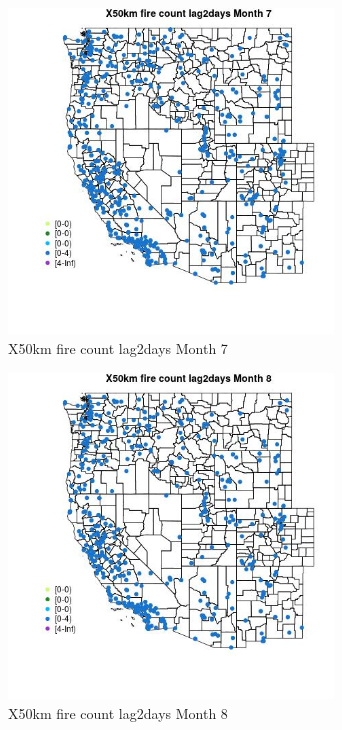 \begin{figure} 
\centering  
\includegraphics[width=0.77\textwidth]{Code_Outputs/Report_ML_input_PM25_Step4_part_e_de_duplicated_aves_compiled_2019-05-14wNAs_MapObsMo7X50km_fire_count_lag2days.jpg} 
\caption{\label{fig:Report_ML_input_PM25_Step4_part_e_de_duplicated_aves_compiled_2019-05-14wNAsMapObsMo7X50km_fire_count_lag2days}X50km fire count lag2days Month 7} 
\end{figure} 
 

\clearpage 

\begin{figure} 
\centering  
\includegraphics[width=0.77\textwidth]{Code_Outputs/Report_ML_input_PM25_Step4_part_e_de_duplicated_aves_compiled_2019-05-14wNAs_MapObsMo8X50km_fire_count_lag2days.jpg} 
\caption{\label{fig:Report_ML_input_PM25_Step4_part_e_de_duplicated_aves_compiled_2019-05-14wNAsMapObsMo8X50km_fire_count_lag2days}X50km fire count lag2days Month 8} 
\end{figure} 
 

